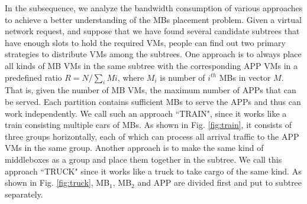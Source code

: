 \documentclass[10pt, conference, letterpaper]{IEEEtran}
\begin{document}
In the subsequence, we analyze the bandwidth consumption of various approaches to achieve a better understanding of the MBs placement problem. Given a virtual network request, and suppose that we have found several candidate subtrees that have enough slots to hold the required VMs, people can find out two primary strategies to distribute VMs among the subtrees. One approach is to always place all kinds of MB VMs in the same subtree with the corresponding APP VMs in a predefined ratio $R=N/\sum_{i} M{i}$, where $M_{i}$ is number of $i^{th}$ MBs in vector $M$. That is, given the number of MB VMs, the maximum number of APPs that can be served. Each partition contains sufficient MBs to serve the APPs and thus can work independently. We call such an approach ``TRAIN", since it works like a train consisting multiple cars of MBs. As shown in Fig. \ref{fig:train}, it consists of three groups horizontally, each of which can process all arrival traffic to the APP VMs in the same group. Another approach is to make the same kind of middleboxes as a group and place them together in the subtree. We call this approach ``TRUCK" since it works like a truck to take cargo of the same kind. As shown in Fig. \ref{fig:truck}, MB$_{1}$, MB$_{2}$ and APP are divided first and put to subtree separately.

\end{document}
